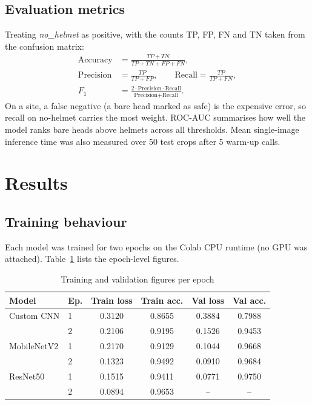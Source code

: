 \documentclass[conference]{IEEEtran}
\begin{document}
\subsection{Evaluation metrics}
Treating \emph{no\_helmet} as positive, with the counts TP, FP, FN and TN taken from the confusion matrix:
\begin{align}
\text{Accuracy} &= \frac{TP + TN}{TP + TN + FP + FN},\\
\text{Precision} &= \frac{TP}{TP + FP}, \qquad \text{Recall} = \frac{TP}{TP + FN},\\
F_1 &= \frac{2 \cdot \text{Precision} \cdot \text{Recall}}{\text{Precision} + \text{Recall}}.
\end{align}
On a site, a false negative (a bare head marked as safe) is the expensive error, so recall on no-helmet carries the most weight. ROC-AUC summarises how well the model ranks bare heads above helmets across all thresholds. Mean single-image inference time was also measured over 50 test crops after 5 warm-up calls.

\section{Results}
\subsection{Training behaviour}
Each model was trained for two epochs on the Colab CPU runtime (no GPU was attached). Table~\ref{tab:training} lists the epoch-level figures.

\begin{table}[t]
\centering
\caption{Training and validation figures per epoch}
\label{tab:training}
\setlength{\tabcolsep}{2.5pt}
\footnotesize
\begin{tabular}{llcccc}
\toprule
Model & Ep. & Train loss & Train acc. & Val loss & Val acc. \\
\midrule
Custom CNN & 1 & 0.3120 & 0.8655 & 0.3884 & 0.7988 \\
 & 2 & 0.2106 & 0.9195 & 0.1526 & 0.9453 \\
\midrule
MobileNetV2 & 1 & 0.2170 & 0.9129 & 0.1044 & 0.9668 \\
 & 2 & 0.1323 & 0.9492 & 0.0910 & 0.9684 \\
\midrule
ResNet50 & 1 & 0.1515 & 0.9411 & 0.0771 & 0.9750 \\
 & 2 & 0.0894 & 0.9653 & -- & -- \\
\bottomrule
\end{tabular}
\end{table}
\end{document}
